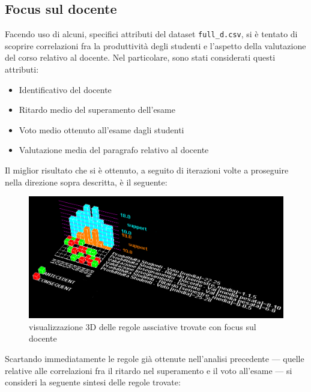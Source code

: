         \subsection{Focus sul docente}

            Facendo uso di alcuni, specifici attributi del dataset \texttt{full\_d.csv}, si è tentato di scoprire correlazioni fra la produttività degli studenti e l'aspetto della valutazione del corso relativo al docente. Nel particolare, sono stati considerati questi attributi:

            \begin{itemize}
                \item Identificativo del docente
                \item Ritardo medio del superamento dell'esame
                \item Voto medio ottenuto all'esame dagli studenti
                \item Valutazione media del paragrafo relativo al docente
            \end{itemize}

            Il miglior risultato che si è ottenuto, a seguito di iterazioni volte a proseguire nella direzione sopra descritta, è il seguente:

            

            \begin{figure}
                \centering
                \caption{visualizzazione 3D delle regole assciative trovate con focus sul docente}
                \label{apriori_min_2}
	            \includegraphics[scale=0.5]{../ass/apriori_min_2.png}
            \end{figure}

            Scartando immediatamente le regole già ottenute nell'analisi precedente --- quelle relative alle correlazioni fra il ritardo nel superamento e il voto all'esame --- si consideri la seguente sintesi delle regole trovate:

